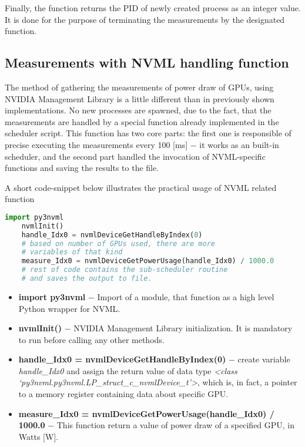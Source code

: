 Finally, the function returns the PID of newly created process
as an integer value. It is done for the purpose of terminating the
measurements by the designated function.

\subsection{Measurements with NVML handling function}

The method of gathering the measurements of power draw of GPUs, using NVIDIA
Management Library is a little different than in previously shown
implementations. No new processes are spawned, due to the fact, that the
measurements are handled by a special function already implemented in the
scheduler script. This function has two core parts: the first one is
responsible of precise executing the measurements every 100 [ms] $-$ it works
as an built-in scheduler, and the second part handled the invocation of
NVML-specific functions and saving the results to the file.

A short code-snippet below illustrates the practical usage of NVML related
function

\begin{lstlisting}[language=Python]
    import py3nvml
    nvmlInit()
    handle_Idx0 = nvmlDeviceGetHandleByIndex(0)
    # based on number of GPUs used, there are more
    # variables of that kind
    measure_Idx0 = nvmlDeviceGetPowerUsage(handle_Idx0) / 1000.0
    # rest of code contains the sub-scheduler routine
    # and saves the output to file.
\end{lstlisting}

\begin{itemize}
    \item \textbf{import py3nvml} $-$ Import of a module, that function as
    a high level Python wrapper for NVML\@.
    \item \textbf{nvmlInit\@()} $-$ NVIDIA Management Library initialization.
    It is mandatory to run before calling any other methods.
    \item \textbf{handle\_Idx0 = nvmlDeviceGetHandleByIndex\@(0)} $-$ create
    variable \emph{handle\_Idx0} and assign the return value of data type
    \emph{<class `py3nvml.py3nvml.LP\_struct\_c\_nvmlDevice\_t'>}, which is,
    in fact, a pointer to a memory register containing data about specific
    GPU\@.
    \item \textbf{measure\_Idx0 = nvmlDeviceGetPowerUsage\@(handle\_Idx0) / 1000.0}
    $-$ This function return a value of power draw of a specified GPU, in
    Watts [W]. 
\end{itemize}

